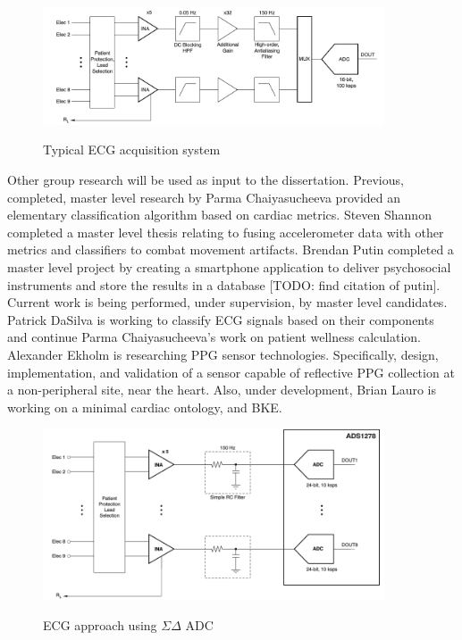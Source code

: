 \begin{figure}
	\begin{center}
		\label{fig:SAR_topology}
		\includegraphics[scale=1,width=0.9\textwidth]{Images/SAR_topology.png} 
		\caption{Typical ECG acquisition system }
	\end{center}
\end{figure}

Other group research will be used as input to the dissertation. Previous, completed, master level research by Parma Chaiyasucheeva provided an elementary classification algorithm based on cardiac metrics\cite{Chaiyasucheeva2012}. Steven Shannon completed a master level thesis relating to fusing accelerometer data with other metrics and classifiers to combat movement artifacts\cite{Shannon2012}. Brendan Putin completed a master level project by creating a smartphone application to deliver psychosocial instruments and store the results in a database  [TODO: find citation of putin]. Current work is being performed, under supervision, by master level candidates. Patrick DaSilva is working to classify ECG signals based on their components and continue Parma Chaiyasucheeva's work on patient wellness calculation. Alexander Ekholm is researching PPG sensor technologies. Specifically, design, implementation, and validation of a sensor capable of reflective PPG collection at a non-peripheral site, near the heart.  Also, under development, Brian Lauro is working on a minimal cardiac ontology, and BKE.

\begin{figure}
	\begin{center}
		\label{fig:sigmaDelta_topology}
		\includegraphics[scale=1,width=0.9\textwidth]{Images/sigmaDelta_topology_simultanious.png} 
		\caption{ECG approach using $\Sigma\Delta $ ADC}
	\end{center}
\end{figure}

